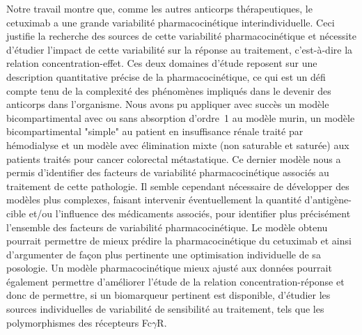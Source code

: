 Notre travail montre que, comme les autres anticorps thérapeutiques, le cetuximab a une grande variabilité pharmacocinétique interindividuelle. Ceci justifie la recherche des sources de cette variabilité pharmacocinétique et nécessite d'étudier l'impact de cette variabilité sur la réponse au traitement, c'est-à-dire la relation concentration-effet. Ces deux domaines d'étude reposent sur une description quantitative précise de la pharmacocinétique, ce qui est un défi compte tenu de la complexité des phénomènes impliqués dans le devenir des anticorps dans l'organisme. Nous avons pu appliquer avec succès un modèle bicompartimental avec ou sans absorption d'ordre~1 au modèle murin, un modèle bicompartimental "simple" au patient en insuffisance rénale traité par hémodialyse et un modèle avec élimination mixte (non saturable et saturée) aux patients traités pour cancer colorectal métastatique. Ce dernier modèle nous a permis d'identifier des facteurs de variabilité pharmacocinétique associés au traitement de cette pathologie. Il semble cependant nécessaire de développer des modèles plus complexes, faisant intervenir éventuellement la quantité d'antigène-cible et/ou l'influence des  médicaments associés, pour identifier plus précisément l'ensemble des facteurs de variabilité pharmacocinétique. Le modèle obtenu pourrait permettre de mieux prédire la pharmacocinétique du cetuximab et ainsi d'argumenter de façon plus pertinente une optimisation individuelle de sa posologie. Un modèle pharmacocinétique mieux ajusté aux données pourrait également permettre d'améliorer l'étude de la relation concentration-réponse et donc de permettre, si un biomarqueur pertinent est disponible, d'étudier les sources individuelles de variabilité de sensibilité au traitement, tels que les polymorphismes des récepteurs Fc$\gamma$R.
